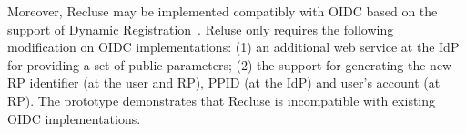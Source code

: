 Moreover, Recluse may be implemented compatibly with OIDC based on the support of Dynamic Registration~\cite{DynamicRegistration}. Reluse only requires the following modification on  OIDC implementations: (1) an additional web service at the IdP for providing a  set of public parameters; (2) the support for generating  the new RP identifier (at the user and RP), PPID (at the IdP) and user's account (at RP). The prototype demonstrates  that Recluse is incompatible with existing OIDC implementations.


